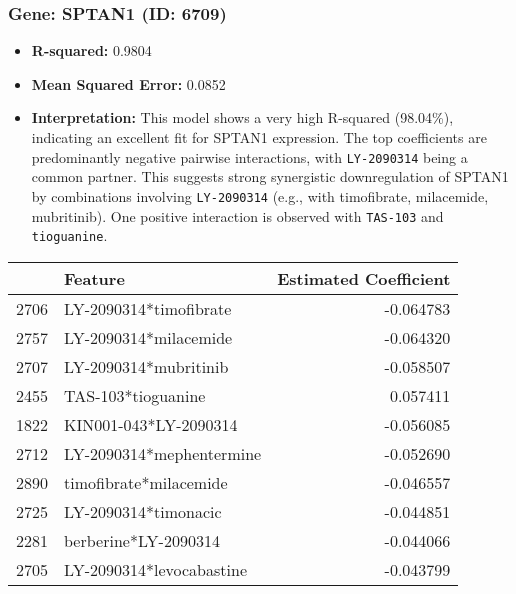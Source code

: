 \documentclass[12pt]{article}
\begin{document}
\subsubsection{Gene: SPTAN1 (ID: 6709)}
\begin{itemize}
    \item \textbf{R-squared:} 0.9804
    \item \textbf{Mean Squared Error:} 0.0852
    \item \textbf{Interpretation:} This model shows a very high R-squared (98.04\%), indicating an excellent fit for SPTAN1 expression. The top coefficients are predominantly negative pairwise interactions, with \texttt{LY-2090314} being a common partner. This suggests strong synergistic downregulation of SPTAN1 by combinations involving \texttt{LY-2090314} (e.g., with timofibrate, milacemide, mubritinib). One positive interaction is observed with \texttt{TAS-103} and \texttt{tioguanine}.
\end{itemize}
\begin{tabularx}{\textwidth}{l X r}
\toprule
{} & Feature & Estimated Coefficient \\
\midrule
2706 & LY-2090314*timofibrate & -0.064783 \\
2757 & LY-2090314*milacemide & -0.064320 \\
2707 & LY-2090314*mubritinib & -0.058507 \\
2455 & TAS-103*tioguanine & 0.057411 \\
1822 & KIN001-043*LY-2090314 & -0.056085 \\
2712 & LY-2090314*mephentermine & -0.052690 \\
2890 & timofibrate*milacemide & -0.046557 \\
2725 & LY-2090314*timonacic & -0.044851 \\
2281 & berberine*LY-2090314 & -0.044066 \\
2705 & LY-2090314*levocabastine & -0.043799 \\
\bottomrule
\end{tabularx}
\end{document}
